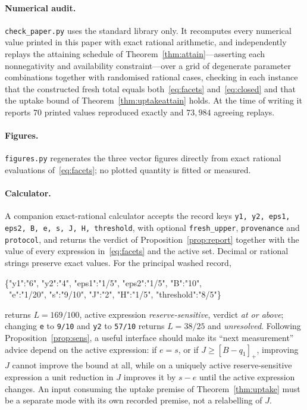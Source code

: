 \documentclass[11pt]{article}
\theoremstyle{plain}
\theoremstyle{definition}
\theoremstyle{remark}
\newcommand{\pos}[1]{\left[#1\right]_{+}}
\newcommand{\Lc}{L}
\begin{document}
\paragraph{Numerical audit.} \texttt{check\_paper.py} uses the standard
library only. It recomputes every numerical value printed in this paper with
exact rational arithmetic, and independently replays the attaining schedule of
Theorem~\ref{thm:attain}---asserting each nonnegativity and availability
constraint---over a grid of degenerate parameter combinations together with
randomised rational cases, checking in each instance that the constructed
fresh total equals both~\eqref{eq:facets} and~\eqref{eq:closed} and that the
uptake bound of Theorem~\ref{thm:uptakeattain} holds. At the time of writing
it reports $70$ printed values reproduced exactly and $73{,}984$ agreeing
replays.

\paragraph{Figures.} \texttt{figures.py} regenerates the three vector figures
directly from exact rational evaluations of~\eqref{eq:facets}; no plotted
quantity is fitted or measured.

\paragraph{Calculator.} A companion exact-rational calculator accepts the
record keys \texttt{y1, y2, eps1, eps2, B, e, s, J, H, threshold}, with
optional \texttt{fresh\_upper}, \texttt{provenance} and \texttt{protocol}, and
returns the verdict of Proposition~\ref{prop:report} together with the value
of every expression in~\eqref{eq:facets} and the active set. Decimal or
rational strings preserve exact values. For the principal washed record,
\begin{center}\footnotesize\ttfamily
\{"y1":"6", "y2":"4", "eps1":"1/5", "eps2":"1/5", "B":"10",\\
\ "e":"1/20", "s":"9/10", "J":"2", "H":"1/5", "threshold":"8/5"\}
\end{center}
returns $\Lc=169/100$, active expression \emph{reserve-sensitive}, verdict
\emph{at or above}; changing \texttt{e} to \texttt{9/10} and \texttt{y2} to
\texttt{57/10} returns $\Lc=38/25$ and \emph{unresolved}. Following
Proposition~\ref{prop:sens}, a useful interface should make its
``next measurement'' advice depend on the active expression: if $e=s$, or if
$J\ge\pos{B-q_1}$, improving $J$ cannot improve the bound at all, while on a
uniquely active reserve-sensitive expression a unit reduction in $J$ improves
it by $s-e$ until the active expression changes. An input consuming the
uptake premise of Theorem~\ref{thm:uptake} must be a separate mode with its
own recorded premise, not a relabelling of $J$.
\end{document}
